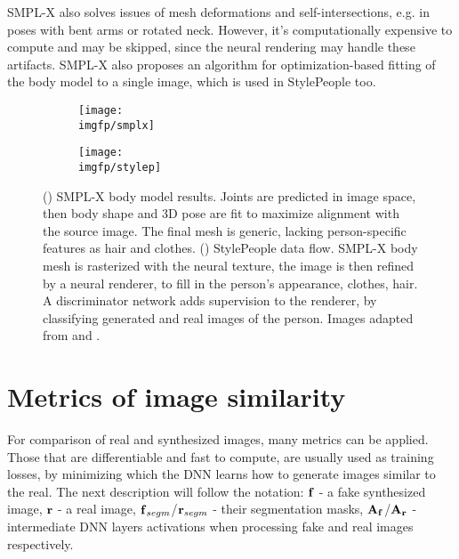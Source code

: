 SMPL-X also solves issues of mesh deformations and self-intersections, e.g. in poses with bent arms or rotated neck. However, it's computationally expensive to compute and may be skipped, since the neural rendering may handle these artifacts. SMPL-X also proposes an algorithm for optimization-based fitting of the body model to a single image, which is used in StylePeople too. 

\begin{figure}[h!]
	\setlength\abovedisplayskip{0pt}
	\centering
	\begin{subfigure}[b]{0.39\textwidth}
		\centering
		\texttt{[image: \\imgfp/smplx]}
		\caption{}
		\label{lit:fig:smplx}
	\end{subfigure}
	\hfill
	\begin{subfigure}[b]{0.60\textwidth}
		\centering
		\texttt{[image: \\imgfp/stylep]}
		\caption{}
		\label{lit:fig:stylepeople}
	\end{subfigure}
	\label{lit:fig:avatars}
	\vspace*{-2em}
	\caption{(\protect{}) SMPL-X body model results. Joints are predicted in image space, then body shape and 3D pose are fit to maximize alignment with the source image. The final mesh is generic, lacking person-specific features as hair and clothes. (\protect{}) StylePeople data flow. SMPL-X body mesh is rasterized with the neural texture, the image is then refined by a neural renderer, to fill in the person's appearance, clothes, hair. A discriminator network adds supervision to the renderer, by classifying generated and real images of the person. Images adapted from \cite{dnn:smplx19} and \cite{dnn:stylepeople21}.}
	\setlength\belowdisplayskip{0pt}
\end{figure}
\vspace*{-2em}
\section{Metrics of image similarity}
\label{lit:metrics}

For comparison of real and synthesized images, many metrics can be applied. Those that are differentiable and fast to compute, are usually used as training losses, by minimizing which the DNN learns how to generate images similar to the real. The next description will follow the notation: $\bm{\mathrm{f}}$ - a fake synthesized image, $\bm{\mathrm{r}}$ - a real image, $\bm{\mathrm{f}}_{segm}$/$\bm{\mathrm{r}}_{segm}$ - their segmentation masks, $\bm{\mathrm{A_f}}$/$\bm{\mathrm{A_r}}$ - intermediate DNN layers activations when processing fake and real images respectively.

